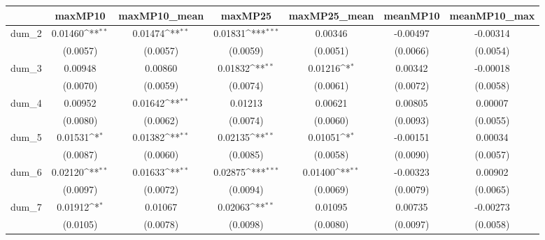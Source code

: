{
\def\sym#1{\ifmmode^{#1}\else\(^{#1}\)\fi}
\begin{tabular}{l*{6}{c}}
\toprule
            &\multicolumn{1}{c}{maxMP10}&\multicolumn{1}{c}{maxMP10\_mean}&\multicolumn{1}{c}{maxMP25}&\multicolumn{1}{c}{maxMP25\_mean}&\multicolumn{1}{c}{meanMP10}&\multicolumn{1}{c}{meanMP10\_max}\\
\midrule
dum\_2       &     0.01460\sym{**} &     0.01474\sym{**} &     0.01831\sym{***}&     0.00346         &    -0.00497         &    -0.00314         \\
            &    (0.0057)         &    (0.0057)         &    (0.0059)         &    (0.0051)         &    (0.0066)         &    (0.0054)         \\
dum\_3       &     0.00948         &     0.00860         &     0.01832\sym{**} &     0.01216\sym{*}  &     0.00342         &    -0.00018         \\
            &    (0.0070)         &    (0.0059)         &    (0.0074)         &    (0.0061)         &    (0.0072)         &    (0.0058)         \\
dum\_4       &     0.00952         &     0.01642\sym{**} &     0.01213         &     0.00621         &     0.00805         &     0.00007         \\
            &    (0.0080)         &    (0.0062)         &    (0.0074)         &    (0.0060)         &    (0.0093)         &    (0.0055)         \\
dum\_5       &     0.01531\sym{*}  &     0.01382\sym{**} &     0.02135\sym{**} &     0.01051\sym{*}  &    -0.00151         &     0.00034         \\
            &    (0.0087)         &    (0.0060)         &    (0.0085)         &    (0.0058)         &    (0.0090)         &    (0.0057)         \\
dum\_6       &     0.02120\sym{**} &     0.01633\sym{**} &     0.02875\sym{***}&     0.01400\sym{**} &    -0.00323         &     0.00902         \\
            &    (0.0097)         &    (0.0072)         &    (0.0094)         &    (0.0069)         &    (0.0079)         &    (0.0065)         \\
dum\_7       &     0.01912\sym{*}  &     0.01067         &     0.02063\sym{**} &     0.01095         &     0.00735         &    -0.00273         \\
            &    (0.0105)         &    (0.0078)         &    (0.0098)         &    (0.0080)         &    (0.0097)         &    (0.0058)         \\

\end{tabular}}
